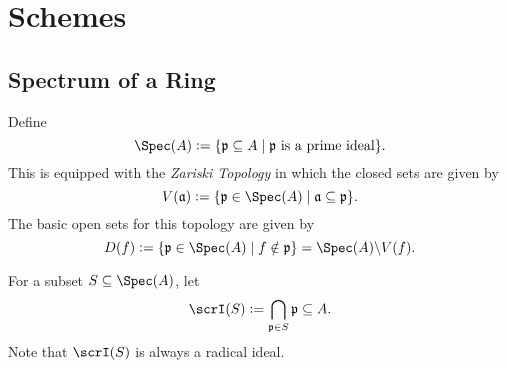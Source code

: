 
\section{Schemes}

\subsection{Spectrum of a Ring}

\begin{definition}
    Define 
    \begin{equation*}
        \Spec(A) := \{\frakp\subseteq A\mid\frakp\text{ is a prime ideal}\}.
    \end{equation*}
    This is equipped with the \emph{Zariski Topology} in which the closed sets are given by 
    \begin{equation*}
        V(\fraka) := \{\frakp\in\Spec(A)\mid\fraka\subseteq\frakp\}.
    \end{equation*}
    The basic open sets for this topology are given by 
    \begin{equation*}
        D(f) := \{\frakp\in\Spec(A)\mid f\notin\frakp\} = \Spec(A)\backslash V(f).
    \end{equation*}

    For a subset $S\subseteq\Spec(A)$, let 
    \begin{equation*}
        \scrI(S) := \bigcap_{\frakp\in S}\frakp\subseteq A.
    \end{equation*}
    Note that $\scrI(S)$ is always a radical ideal.
\end{definition}

